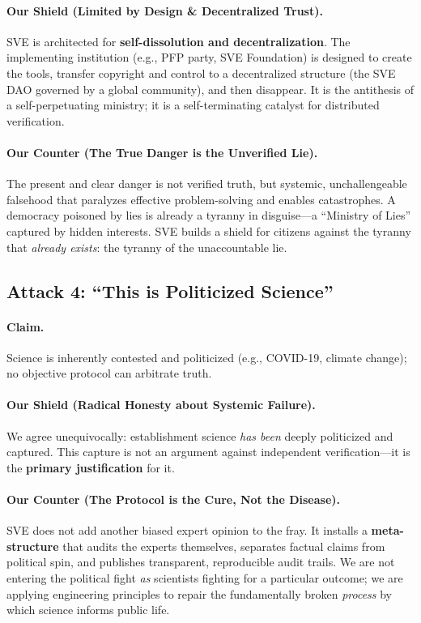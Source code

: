\documentclass[11pt,a4paper]{article}
\begin{document}
\paragraph{\textbf{Our Shield (Limited by Design \& Decentralized Trust).}} SVE is architected for \textbf{self-dissolution and decentralization}. The implementing institution (e.g., PFP party, SVE Foundation) is designed to create the tools, transfer copyright and control to a decentralized structure (the SVE DAO governed by a global community), and then disappear. It is the antithesis of a self-perpetuating ministry; it is a self-terminating catalyst for distributed verification.

\paragraph{\textbf{Our Counter (The True Danger is the Unverified Lie).}} The present and clear danger is not verified truth, but systemic, unchallengeable falsehood that paralyzes effective problem-solving and enables catastrophes. A democracy poisoned by lies is already a tyranny in disguise—a ``Ministry of Lies'' captured by hidden interests. SVE builds a shield for citizens against the tyranny that \textit{already exists}: the tyranny of the unaccountable lie.

\vspace{1em}

\subsection*{\textcolor{accentcolor}{Attack 4: ``This is Politicized Science''}}

\paragraph{\textbf{Claim.}} Science is inherently contested and politicized (e.g., COVID-19, climate change); no objective protocol can arbitrate truth.

\paragraph{\textbf{Our Shield (Radical Honesty about Systemic Failure).}} We agree unequivocally: establishment science \textit{has been} deeply politicized and captured. This capture is not an argument against independent verification—it is the \textbf{primary justification} for it.

\paragraph{\textbf{Our Counter (The Protocol is the Cure, Not the Disease).}} SVE does not add another biased expert opinion to the fray. It installs a \textbf{meta-structure} that audits the experts themselves, separates factual claims from political spin, and publishes transparent, reproducible audit trails. We are not entering the political fight \textit{as} scientists fighting for a particular outcome; we are applying engineering principles to repair the fundamentally broken \textit{process} by which science informs public life.
\end{document}
